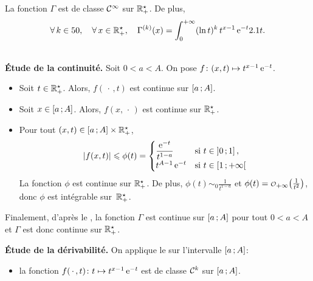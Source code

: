 

\begin{theo}[Régularité] \label{theo:regularite_fonction_gamma}
La fonction $\Gamma$ est de classe $\Cont^\infty$ sur $\Rpe$. De plus,
\[
\forall k \in \N,\quad \forall x \in \Rpe,\quad \Gamma^{(k)}(x) = \int_{0}^{+\infty} (\ln t)^k \, t^{x-1} \, \e^{-t} \d t.
\]
\end{theo}

\begin{demo} \\
\textbf{Étude de la continuité.} Soit $0 < a < A$. On pose $\fonctionligne[f]{(x, t)}{t^{x-1} \, \e^{-t}}$.
\begin{itemize}
\item Soit $t \in \Rpe$. Alors, $f(\,\cdot\,, t)$ est continue sur $\interff{a}{A}$.

\item Soit $x \in \interff{a}{A}$. Alors, $f(x, \,\cdot\,)$ est continue sur $\Rpe$.

\item Pour tout $(x, t) \in \interff{a}{A} \times \Rpe$,
\[
\abs{f(x, t)} \leqslant \phi(t) = 
\begin{cases}
\displaystyle \frac{\e^{-t}}{t^{1-a}} &\text{si } t \in \interof{0}{1},\\
t^{A-1} \, \e^{-t} &\text{si } t \in \interfo{1}{+\infty}
\end{cases}
\]
La fonction $\phi$ est continue sur $\Rpe$. De plus, $\phi(t) \sim_0 \frac{1}{t^{1 - a}}$ et $\phi(t) = \petito_{+\infty}\mathopen{}\left(\frac{1}{t^2}\right)$, donc $\phi$ est intégrable sur~$\Rpe$.
\end{itemize}
Finalement, d'après le , la fonction $\Gamma$ est continue sur $\interff{a}{A}$ pour tout $0 < a < A$ et $\Gamma$ est donc continue sur $\Rpe$.

\textbf{Étude de la dérivabilité.} On applique le  sur l'intervalle $\interff{a}{A}$:
\begin{itemize}
\item la fonction $\fonctionligne[f(\,\cdot\,, t)]{t}{t^{x - 1} \, \e^{-t}}$ est de classe $\Cont^k$ sur $\interff{a}{A}$.


\end{itemize}
\end{demo}
